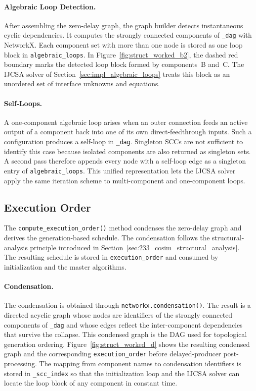 \paragraph{Algebraic Loop Detection.}
After assembling the zero-delay graph, the graph builder detects instantaneous cyclic dependencies.
It computes the strongly connected components of \texttt{\_dag} with NetworkX.
Each component set with more than one node is stored as one loop block in \texttt{algebraic\_loops}.
In Figure~\ref{fig:struct_worked_b2}, the dashed red boundary marks the detected loop block formed by components~B and~C.
The \ac{IJCSA} solver of Section~\ref{sec:impl_algebraic_loops} treats this block as an unordered set of interface unknowns and equations.

\paragraph{Self-Loops.}
A one-component algebraic loop arises when an outer connection feeds an active output of a component back into one of its own direct-feedthrough inputs.
Such a configuration produces a self-loop in \texttt{\_dag}.
Singleton \acp{SCC} are not sufficient to identify this case because isolated components are also returned as singleton sets.
A second pass therefore appends every node with a self-loop edge as a singleton entry of \texttt{algebraic\_loops}.
This unified representation lets the \ac{IJCSA} solver apply the same iteration scheme to multi-component and one-component loops.

\subsection{Execution Order}
\label{sec:impl_structural_condensation}

The \texttt{compute\_execution\_order()} method condenses the zero-delay graph and derives the generation-based schedule.
The condensation follows the structural-analysis principle introduced in Section~\ref{sec:233_cosim_structural_analysis}.
The resulting schedule is stored in \texttt{execution\_order} and consumed by initialization and the master algorithms.

\paragraph{Condensation.}
The condensation is obtained through \texttt{networkx.condensation()}.
The result is a directed acyclic graph whose nodes are identifiers of the strongly connected components of \texttt{\_dag} and whose edges reflect the inter-component dependencies that survive the collapse.
This condensed graph is the \ac{DAG} used for topological generation ordering.
Figure~\ref{fig:struct_worked_d} shows the resulting condensed graph and the corresponding \texttt{execution\_order} before delayed-producer post-processing.
The mapping from component names to condensation identifiers is stored in \texttt{\_scc\_index} so that the initialization loop and the \ac{IJCSA} solver can locate the loop block of any component in constant time.

